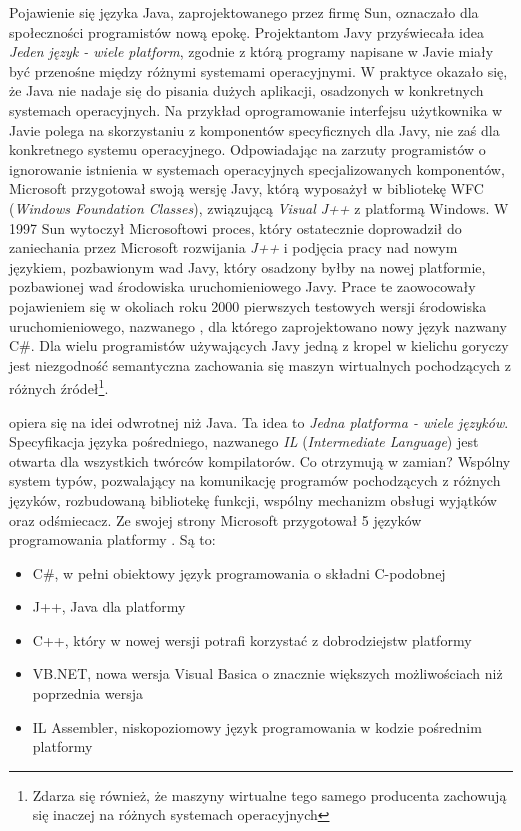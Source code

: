 Pojawienie się języka Java, zaprojektowanego przez firmę Sun, oznaczało dla społeczności programistów
nową epokę. Projektantom Javy przyświecała idea {\em Jeden język - wiele platform}, zgodnie z którą
programy napisane w Javie miały być przenośne między różnymi systemami operacyjnymi. 
W praktyce okazało się, że Java nie nadaje się do pisania dużych aplikacji, osadzonych w konkretnych
systemach operacyjnych. Na przykład oprogramowanie interfejsu użytkownika w Javie polega na skorzystaniu
z komponentów specyficznych dla Javy, nie zaś dla konkretnego systemu operacyjnego. 
Odpowiadając na zarzuty programistów o 
ignorowanie istnienia w systemach operacyjnych specjalizowanych komponentów, Microsoft
przygotował swoją wersję Javy, którą wyposażył w bibliotekę WFC ({\em Windows Foundation Classes}), związującą
{\em Visual J++} z platformą Windows. W 1997 Sun wytoczył Microsoftowi proces, który ostatecznie doprowadził
do zaniechania przez Microsoft rozwijania {\em J++} i podjęcia pracy nad nowym językiem, pozbawionym wad Javy,
który osadzony byłby na nowej platformie, pozbawionej wad środowiska uruchomieniowego Javy. Prace te
zaowocowały pojawieniem się w okoliach roku 2000 pierwszych testowych wersji środowiska uruchomieniowego, 
nazwanego \NETFramework{}, dla którego zaprojektowano nowy język nazwany C\#. Dla wielu programistów 
używających Javy jedną z kropel w kielichu goryczy jest niezgodność semantyczna zachowania się 
maszyn wirtualnych pochodzących z różnych źródeł\footnote{Zdarza się również, że maszyny wirtualne
tego samego producenta zachowują się inaczej na różnych systemach operacyjnych}.

\NETFramework{} opiera się na idei odwrotnej niż Java. Ta idea to {\em Jedna platforma - wiele języków}.
Specyfikacja języka pośredniego, nazwanego {\em IL} ({\em Intermediate Language}) 
jest otwarta dla wszystkich twórców kompilatorów. Co otrzymują w zamian? Wspólny system typów, pozwalający
na komunikację programów pochodzących z różnych języków, rozbudowaną bibliotekę funkcji, wspólny mechanizm
obsługi wyjątków oraz odśmiecacz. Ze swojej strony Microsoft przygotował 5 języków programowania platformy \NET.
Są to:
\begin{itemize}
	\item C\#, w pełni obiektowy język programowania o składni C-podobnej
	\item J++, Java dla platformy \NET
	\item C++, który w nowej wersji potrafi korzystać z dobrodziejstw platformy \NET
	\item VB.NET, nowa wersja Visual Basica o znacznie większych możliwościach niż poprzednia wersja
	\item IL Assembler, niskopoziomowy język programowania w kodzie pośrednim platformy \NET
\end{itemize}

